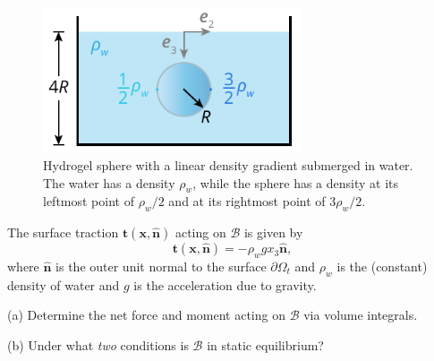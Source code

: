 \begin{figure}[H]
\vspace{-2em}
\centering
\includegraphics[width=3in]{instr-figures/PS2-Q1.pdf}
\caption{\small{Hydrogel sphere with a linear density gradient submerged in water. The water has a density $\rho_w$, while the sphere has a density at its leftmost point of $\rho_w/2$ and at its rightmost point of $3\rho_w/2$.}}
\end{figure}

\vspace{-1em}
The surface traction $\bm{t}(\bm{x},\hat{\bm{n}})$ acting on $\mathcal{B}$ is given by 
\begin{equation*}
\bm{t}(\bm{x},\hat{\bm{n}}) = -\rho_w g x_3 \hat{\bm{n}},
\end{equation*}
where $\hat{\bm{n}}$ is the outer unit normal to the surface $\partial \Omega_t$ and $\rho_w$ is the (constant) density of water and $g$ is the acceleration due to gravity. 

\medskip
(a) Determine the net force and moment acting on $\mathcal{B}$ via volume integrals.

\medskip
(b) Under what \textit{two} conditions is $\mathcal{B}$ in static equilibrium?



